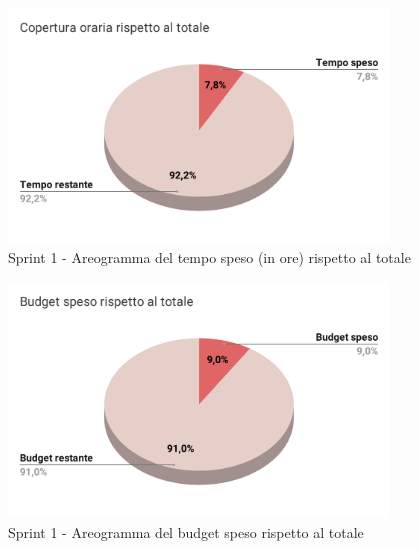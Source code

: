 \begin{figure}[H]
  \centering
  \includegraphics[width=0.90\textwidth]{assets/Consuntivo/Sprint-1/copertura_oraria.pdf}
  \caption{Sprint 1 - Areogramma del tempo speso (in ore) rispetto al totale}
\end{figure}

\begin{figure}[H]
  \centering
  \includegraphics[width=0.90\textwidth]{assets/Consuntivo/Sprint-1/budget_speso.pdf}
  \caption{Sprint 1 - Areogramma del budget speso rispetto al totale}
\end{figure}


